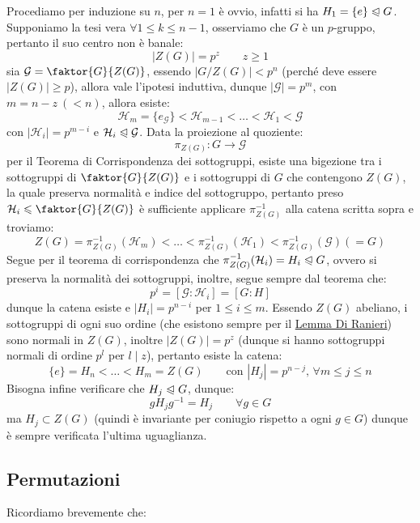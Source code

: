 \documentclass[11pt]{scrartcl}
\begin{document}
\begin{soln}
    Procediamo per induzione su $n$, per $n = 1$ è ovvio, infatti si ha $H_1 = \{e\} \trianglelefteqslant G$.
    Supponiamo la tesi vera $\forall 1 \leq k \leq n-1$, osserviamo che $G$ è un $p$-gruppo, pertanto il suo centro non è banale:
        \[ |Z(G)| = p^z \qquad z\geq 1
            \]
    sia $\mathcal{G} = \faktor{G}{Z(G)}$, essendo $|G/Z(G)| < p^n$ (perché deve essere $|Z(G)| \geq p$), allora vale l'ipotesi induttiva, dunque
    $|\mathcal{G}| = p^m$, con $m = n-z\ (<n)$, allora esiste:
        \[ \mathcal{H}_m = \{e_{\mathcal{G}}\} < \mathcal{H}_{m-1} < \ldots < \mathcal{H}_1 < \mathcal{G}
            \]
    con $|\mathcal{H}_i| = p^{m-i}$ e $\mathcal{H}_i \trianglelefteqslant \mathcal{G}$. Data la proiezione al quoziente:
        \[ \pi_{Z(G)} : G \longrightarrow \mathcal{G}
            \]
    per il Teorema di Corrispondenza dei sottogruppi, esiste una bigezione tra i sottogruppi di $\faktor{G}{Z(G)}$ e i sottogruppi di
    $G$ che contengono $Z(G)$, la quale preserva normalità e indice del sottogruppo, pertanto preso $\mathcal{H}_i \leqslant \faktor{G}{Z(G)}$ è sufficiente
    applicare $\pi_{Z(G)}^{-1}$ alla catena scritta sopra e troviamo:
        \[ Z(G) = \pi_{Z(G)}^{-1}(\mathcal{H}_{m}) < \ldots < \pi_{Z(G)}^{-1}(\mathcal{H}_{1}) < \pi_{Z(G)}^{-1}(\mathcal{G}) (= G)
            \]
    Segue per il teorema di corrispondenza che $\pi_{Z(G)}^{-1}(\mathcal{H}_i) = H_i \trianglelefteqslant G$, ovvero si preserva la normalità dei sottogruppi, inoltre,
    segue sempre dal teorema che:
        \[ p^i = [\mathcal{G} : \mathcal{H}_i] = [G : H]
            \]
    dunque la catena esiste  e $|H_i| = p^{n-i}$ per $1\leq i \leq m$. Essendo $Z(G)$ abeliano, i sottogruppi di ogni suo ordine (che esistono sempre
    per il \hyperref[davide]{Lemma Di Ranieri}) sono normali in $Z(G)$, inoltre $|Z(G)| = p^z$ (dunque si hanno sottogruppi normali di ordine $p^l$ per $l \mid z$), pertanto esiste la catena:
        \[ \{e\} = H_n < \ldots < H_m = Z(G)
        \qquad \text{con $|H_j| = p^{n-j}$, $\forall m \leq j \leq n$} 
            \]
    Bisogna infine verificare che $H_j \trianglelefteqslant G$, dunque:
        \[ gH_jg^{-1} = H_j \qquad \forall g \in G
            \]
    ma $H_j \subset Z(G)$ (quindi è invariante per coniugio rispetto a ogni $g \in G$) dunque è sempre verificata l'ultima uguaglianza.
\end{soln}

\newpage
\subsection{Permutazioni}
Ricordiamo brevemente che:
\end{document}
